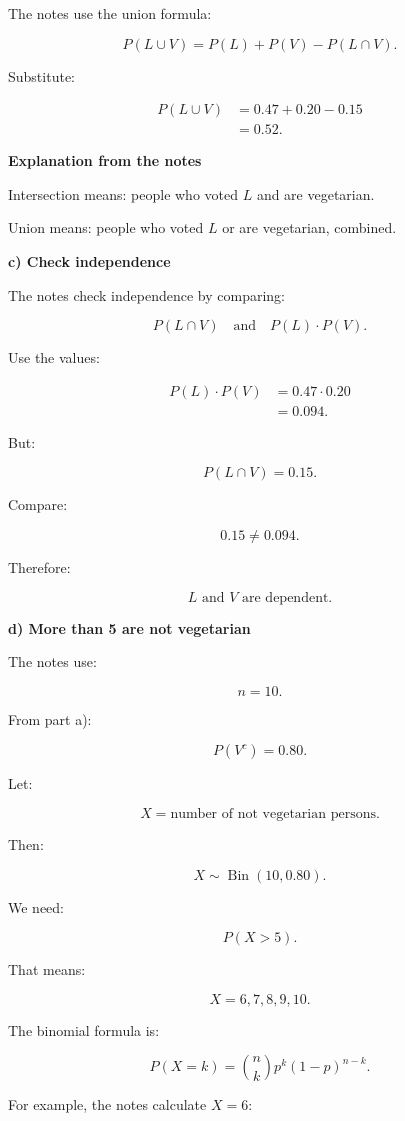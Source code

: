 \documentclass[10pt]{article}
\begin{document}
The notes use the union formula:

\[
P(L\cup V)
=P(L)+P(V)-P(L\cap V).
\]

Substitute:

\begin{align*}
P(L\cup V)
&=0.47+0.20-0.15 \\[2mm]
&=0.52.
\end{align*}

\textbf{Explanation from the notes}

Intersection means:
people who voted \(L\) and are vegetarian.

Union means:
people who voted \(L\) or are vegetarian,
combined.

\textbf{c) Check independence}

The notes check independence by comparing:

\[
P(L\cap V)
\quad \text{and} \quad
P(L)\cdot P(V).
\]

Use the values:

\begin{align*}
P(L)\cdot P(V)
&=0.47\cdot 0.20 \\[2mm]
&=0.094.
\end{align*}

But:

\[
P(L\cap V)=0.15.
\]

Compare:

\[
0.15\neq 0.094.
\]

Therefore:

\[
L \text{ and } V
\text{ are dependent.}
\]

\textbf{d) More than 5 are not vegetarian}

The notes use:

\[
n=10.
\]

From part a):

\[
P(V^c)=0.80.
\]

Let:

\[
X=\text{number of not vegetarian persons}.
\]

Then:

\[
X\sim \operatorname{Bin}(10,0.80).
\]

We need:

\[
P(X>5).
\]

That means:

\[
X=6,7,8,9,10.
\]

The binomial formula is:

\[
P(X=k)
=
\binom{n}{k}
p^k(1-p)^{n-k}.
\]

For example, the notes calculate \(X=6\):
\end{document}
